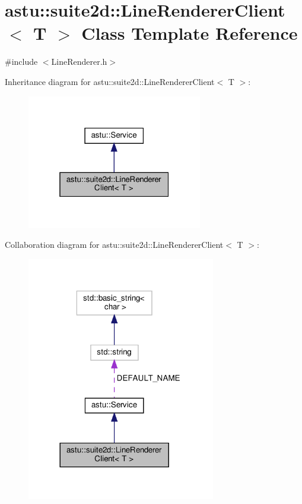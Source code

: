 \hypertarget{classastu_1_1suite2d_1_1LineRendererClient}{}\section{astu\+:\+:suite2d\+:\+:Line\+Renderer\+Client$<$ T $>$ Class Template Reference}
\label{classastu_1_1suite2d_1_1LineRendererClient}


{\ttfamily \#include $<$Line\+Renderer.\+h$>$}



Inheritance diagram for astu\+:\+:suite2d\+:\+:Line\+Renderer\+Client$<$ T $>$\+:\nopagebreak
\begin{figure}[H]
\begin{center}
\leavevmode
\includegraphics[width=217pt]{classastu_1_1suite2d_1_1LineRendererClient__inherit__graph}
\end{center}
\end{figure}


Collaboration diagram for astu\+:\+:suite2d\+:\+:Line\+Renderer\+Client$<$ T $>$\+:\nopagebreak
\begin{figure}[H]
\begin{center}
\leavevmode
\includegraphics[width=233pt]{classastu_1_1suite2d_1_1LineRendererClient__coll__graph}
\end{center}
\end{figure}
